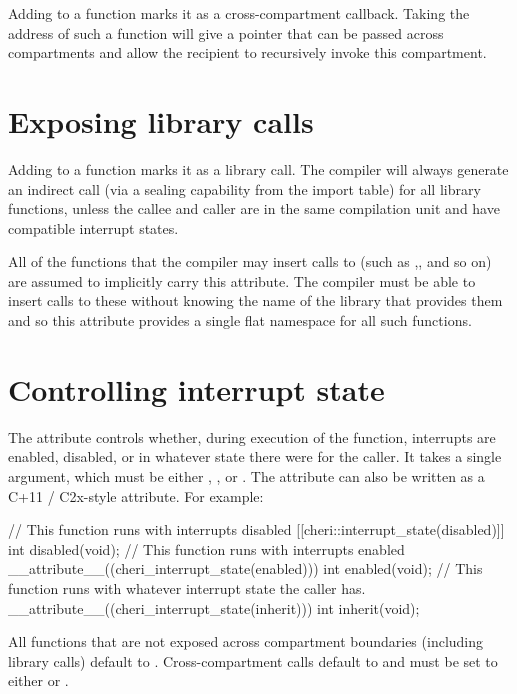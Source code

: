Adding  to a function marks it as a cross-compartment callback.
Taking the address of such a function will give a pointer that can be passed across compartments and allow the recipient to recursively invoke this compartment.

\section{Exposing library calls}

Adding  to a function marks it as a library call.
The compiler will always generate an indirect call (via a sealing capability from the import table) for all library functions, unless the callee and caller are in the same compilation unit and have compatible interrupt states.

All of the functions that the compiler may insert calls to (such as ,, and so on) are assumed to implicitly carry this attribute.
The compiler must be able to insert calls to these without knowing the name of the library that provides them and so this attribute provides a single flat namespace for all such functions.

\section{Controlling interrupt state}

The  attribute controls whether, during execution of the function, interrupts are enabled, disabled, or in whatever state there were for the caller.
It takes a single argument, which must be either , , or .
The attribute can also be written as a C+11 / C2x-style attribute.
For example:

\begin{ccodelisting}
// This function runs with interrupts disabled
[[cheri::interrupt_state(disabled)]]
int disabled(void);
// This function runs with interrupts enabled
__attribute__((cheri_interrupt_state(enabled)))
int enabled(void);
// This function runs with whatever interrupt state the caller has.
__attribute__((cheri_interrupt_state(inherit)))
int inherit(void);
\end{ccodelisting}

All functions that are not exposed across compartment boundaries (including library calls) default to .
Cross-compartment calls default to  and must be set to either  or .

